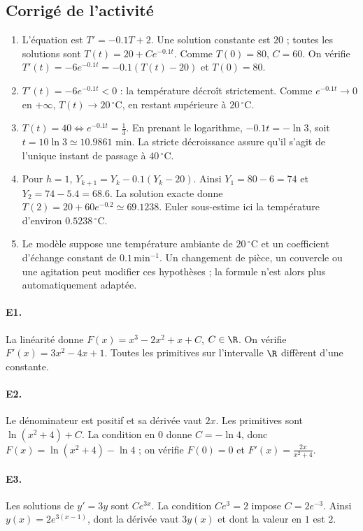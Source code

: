 \subsection{Corrigé de l'activité}\begin{enumerate}
\item L'équation est $T'=-\num{0,1}T+2$. Une solution constante est $20$ ; toutes les solutions sont $T(t)=20+Ce^{-\num{0,1}t}$. Comme $T(0)=80$, $C=60$. On vérifie $T'(t)=-6e^{-\num{0,1}t}=-\num{0,1}(T(t)-20)$ et $T(0)=80$.
\item $T'(t)=-6e^{-\num{0,1}t}<0$ : la température décroît strictement. Comme $e^{-\num{0,1}t}\to0$ en $+\infty$, $T(t)\to20\,^{\circ}\mathrm C$, en restant supérieure à $20\,^{\circ}\mathrm C$.
\item $T(t)=40\Longleftrightarrow e^{-\num{0,1}t}=\frac{1}{3}$. En prenant le logarithme, $-\num{0,1}t=-\ln3$, soit $t=10\ln3\simeq\num{10,9861}$ min. La stricte décroissance assure qu'il s'agit de l'unique instant de passage à $40\,^{\circ}\mathrm C$.
\item Pour $h=1$, $Y_{k+1}=Y_k-\num{0,1}(Y_k-20)$. Ainsi $Y_1=80-6=74$ et $Y_2=74-\num{5,4}=\num{68,6}$. La solution exacte donne $T(2)=20+60e^{-\num{0,2}}\simeq\num{69,1238}$. Euler sous-estime ici la température d'environ $\num{0,5238}\,^{\circ}\mathrm C$.
\item Le modèle suppose une température ambiante de $20\,^{\circ}\mathrm C$ et un coefficient d'échange constant de $\num{0,1}\,\mathrm{min}^{-1}$. Un changement de pièce, un couvercle ou une agitation peut modifier ces hypothèses ; la formule n'est alors plus automatiquement adaptée.
\end{enumerate}

\paragraph{E1.}La linéarité donne $F(x)=x^3-2x^2+x+C$, $C\in\R$. On vérifie $F'(x)=3x^2-4x+1$. Toutes les primitives sur l'intervalle $\R$ diffèrent d'une constante.

\paragraph{E2.}Le dénominateur est positif et sa dérivée vaut $2x$. Les primitives sont $\ln(x^2+4)+C$. La condition en $0$ donne $C=-\ln4$, donc $F(x)=\ln(x^2+4)-\ln4$ ; on vérifie $F(0)=0$ et $F'(x)=\frac{2x}{x^2+4}$.

\paragraph{E3.}Les solutions de $y'=3y$ sont $Ce^{3x}$. La condition $Ce^3=2$ impose $C=2e^{-3}$. Ainsi $y(x)=2e^{3(x-1)}$, dont la dérivée vaut $3y(x)$ et dont la valeur en $1$ est $2$.

